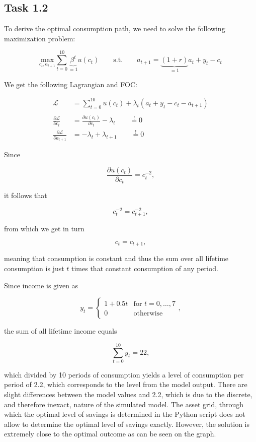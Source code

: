 \documentclass[a4paper, 12pt]{article}
\begin{document}
\subsection*{Task 1.2}

To derive the optimal consumption path, we need to solve the following maximization problem:

\[
    \underset{c_t,a_{t+1}}{\mathrm{max}}\sum^{10}_{t=0}\underbrace{\beta^t}_{=1}u(c_t) \qquad \mathrm{s.t.} \qquad a_{t+1}=\underbrace{(1+r)}_{=1}a_t+y_t-c_t
\]

We get the following Lagrangian and FOC:

\begin{align*}
    \mathcal{L} &= \sum^{10}_{t=0}u(c_t)+\lambda_t(a_t+y_t-c_t-a_{t+1})\\
    \\
    \frac{\partial\mathcal{L}}{\partial c_t} &= \frac{\partial u(c_t)}{\partial c_t} - \lambda_t\qquad \overset{!}{=} 0  \\
    \frac{\partial\mathcal{L}}{\partial a_{t+1}} &= -\lambda_t + \lambda_{t+1}\qquad \overset{!}{=} 0 
\end{align*}

Since 

\[
    \frac{\partial u(c_t)}{\partial c_t} = c_t^{-2},
\]

it follows that

\[
    c_t^{-2} = c_{t+1}^{-2},
\]

from which we get in turn

\[
    c_t = c_{t+1},
\]

meaning that consumption is constant and thus the sum over all lifetime consumption is just $t$ times that constant consumption of any period.

Since income is given as

\[
    y_t = 
    \begin{cases}
        1 + 0.5t & \text{for $t = 0,\dots, 7$}\\
        0 & \text{otherwise}
    \end{cases},
\]

the sum of all lifetime income equals 

\[
    \sum^{10}_{t=0}y_t = 22,
\]

which divided by 10 periods of consumption yields a level of consumption per period of 2.2, which corresponds to the level from the model output. There are slight differences between the model values and 2.2, which is due to the discrete, and therefore inexact, nature of the simulated model. The asset grid, through which the optimal level of savings is determined in the Python script does not allow to determine the optimal level of savings exactly. However, the solution is extremely close to the optimal outcome as can be seen on the graph. 
\end{document}
